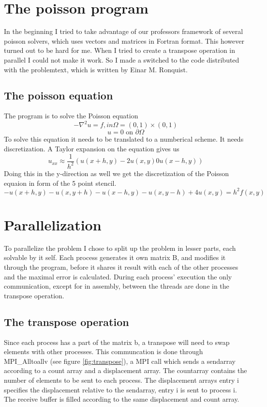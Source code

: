 

\section{The poisson program}
In the beginning I tried to take advantage of our professors framework of several poisson solvers, which uses vectors and matrices in Fortran format. This however turned out to be hard for me. When I tried to create a transpose operation in parallel I could not make it work. So I made a switched to the code distributed with the problemtext, which is written by Einar M. Ronquist. 
\subsection{The poisson equation}
The program is to solve the Poisson equation 
\begin{equation}
-\nabla^2u = f,	in \Omega = (0,1)\times(0,1)
\end{equation}
\begin{equation}
u = 0 \text{	on 	} \partial\Omega
\end{equation}
To solve this equation it needs to be translated to a numberical scheme. It needs discretization. A Taylor expansion on the equation gives us 
\begin{equation}
u_{xx} \approx \frac{1}{h^2}(u(x+h,y) - 2u(x,y) 0 u(x-h,y))
\end{equation}
Doing this in the y-direction as well we get the discretization of the Poisson equaion in form of the 5 point stencil.
\begin{equation}
-u(x+h,y) - u(x,y+h) - u(x-h,y) - u(x,y-h) + 4u(x,y) = h^2 f(x,y)
\end{equation}

\section{Parallelization}
To parallelize the problem I chose to split up the problem in lesser parts, each solvable by it self. Each process generates it own matrix B, and modifies it through the program, before it shares it result with each of the other processes and the maximal error is calculated. During each process' execution the only communication, except for in assembly, between the threads are done in the transpose operation.

\subsection{The transpose operation}
Since each process has a part of the matrix b, a transpose will need to swap elements with other processes. This communcation is done through MPI\_Alltoallv (see figure \ref{fig:transpose}), a MPI call which sends a sendarray according to a count array and a displacement array. The countarray contains the number of elements to be sent to each process. The displacement arrays entry i specifies the displacement relative to the sendarray, entry i is sent to process i. The receive buffer is filled according to the same displacement and count array. 

